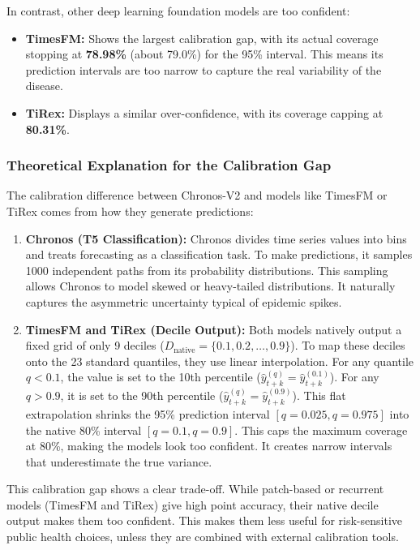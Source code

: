 In contrast, other deep learning foundation models are too confident:
\begin{itemize}
    \item \textbf{TimesFM:} Shows the largest calibration gap, with its actual coverage stopping at \textbf{78.98\%} (about 79.0\%) for the 95\% interval. This means its prediction intervals are too narrow to capture the real variability of the disease.
    \item \textbf{TiRex:} Displays a similar over-confidence, with its coverage capping at \textbf{80.31\%}.
\end{itemize}

\subsubsection{Theoretical Explanation for the Calibration Gap}
The calibration difference between Chronos-V2 and models like TimesFM or TiRex comes from how they generate predictions:
\begin{enumerate}
    \item \textbf{Chronos (T5 Classification):} Chronos divides time series values into bins and treats forecasting as a classification task. To make predictions, it samples 1000 independent paths from its probability distributions. This sampling allows Chronos to model skewed or heavy-tailed distributions. It naturally captures the asymmetric uncertainty typical of epidemic spikes.
    \item \textbf{TimesFM and TiRex (Decile Output):} Both models natively output a fixed grid of only 9 deciles ($D_{\text{native}} = \{0.1, 0.2, \dots, 0.9\}$). To map these deciles onto the 23 standard quantiles, they use linear interpolation. For any quantile $q < 0.1$, the value is set to the 10th percentile ($\hat{y}_{t+k}^{(q)} = \hat{y}_{t+k}^{(0.1)}$). For any $q > 0.9$, it is set to the 90th percentile ($\hat{y}_{t+k}^{(q)} = \hat{y}_{t+k}^{(0.9)}$). This flat extrapolation shrinks the 95\% prediction interval $[q=0.025, q=0.975]$ into the native 80\% interval $[q=0.1, q=0.9]$. This caps the maximum coverage at 80\%, making the models look too confident. It creates narrow intervals that underestimate the true variance.
\end{enumerate}

This calibration gap shows a clear trade-off. While patch-based or recurrent models (TimesFM and TiRex) give high point accuracy, their native decile output makes them too confident. This makes them less useful for risk-sensitive public health choices, unless they are combined with external calibration tools.

